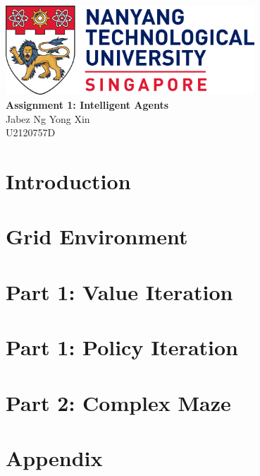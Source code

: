 \documentclass[a4paper,12pt]{article}
\begin{document}
\begin{center}
    \includegraphics[width=0.7\textwidth]{images/logo.png}  %
    \\[60pt]  %
    {\LARGE \textbf{Assignment 1: Intelligent Agents}} \\
    \vspace{20pt}
    {\large Jabez Ng Yong Xin} \\
    \vspace{10pt}  %
    {\large U2120757D}
\end{center}

\vspace{20pt}  %

\setcounter{page}{1}

\pagebreak
\tableofcontents

\newpage

\section{Introduction}


\section{Grid Environment}


\section{Part 1: Value Iteration}


\section{Part 1: Policy Iteration}


\section{Part 2: Complex Maze}


\section{Appendix}

\end{document}
